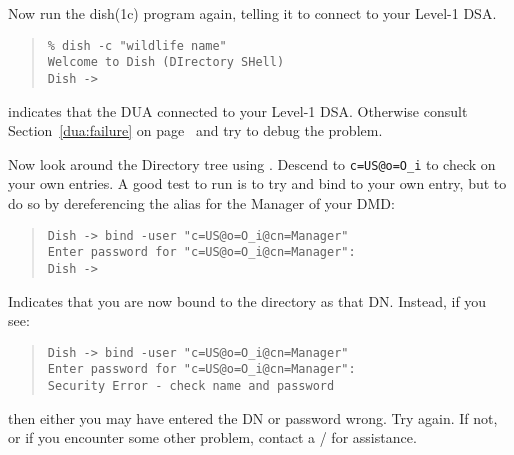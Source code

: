 Now run the \man dish(1c) program again,
telling it to connect to your Level-1 DSA.
\begin{quote}\small\begin{verbatim}
% dish -c "wildlife name"
Welcome to Dish (DIrectory SHell)
Dish ->
\end{verbatim}\end{quote}
indicates that the DUA connected to your Level-1 DSA.
Otherwise consult Section~\ref{dua:failure} on
page~\pageref{dua:failure} and try to debug the problem.

Now look around the Directory tree using .
Descend to \verb"c=US@o=O_i" to check on your own entries.
A good test to run is to try and bind to your own entry,
but to do so by dereferencing the alias for the Manager of your DMD:
\begin{quote}\small\begin{verbatim}
Dish -> bind -user "c=US@o=O_i@cn=Manager"
Enter password for "c=US@o=O_i@cn=Manager": 
Dish -> 
\end{verbatim}\end{quote}
Indicates that you are now bound to the directory as that DN.
Instead, if you see:
\begin{quote}\small\begin{verbatim}
Dish -> bind -user "c=US@o=O_i@cn=Manager"
Enter password for "c=US@o=O_i@cn=Manager": 
Security Error - check name and password
\end{verbatim}\end{quote}
then either you may have entered the DN or password wrong.
Try again.
If not,
or if you encounter some other problem,
contact a \camayoc/ for assistance.

